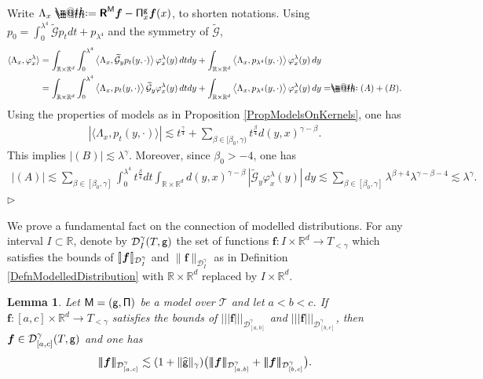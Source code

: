 \documentclass[10pt, reqno]{amsart}
\makeatletter
\numberwithin{subsection}{section}
\numberwithin{subsubsection}{subsection}
\numberwithin{equation}{section} %
\newenvironment{Dem}[1][\unskip]{%
    \begin{list}{\hspace{1.15cm}{\sf \textbf{{\small Proof #1 --}}}}{%
        \setlength{\topsep}{0pt}%
        \setlength{\leftmargin}{0pt}%
        \setlength{\rightmargin}{0pt}%
        \setlength{\listparindent}{0pt}%
        \setlength{\itemindent}{0pt}%
        \setlength{\parsep}{0pt}%
        \addtolength{\leftmargin}{0pt}%
        \addtolength{\rightmargin}{0pt}%
    } \item }{\hfill $\rhd$\end{list}\smallskip}
\theoremstyle{mystyle}
\newtheorem{lem}[thm]{\hspace{-0.14cm}  {Lemma} }%
\theoremstyle{mystyle2}
\theoremstyle{mystyle3}
\newcommand{\trino}[1]{|\!|\!|#1|\!|\!|}
\newcommand{\brarb}[1]{[\hspace{-0.5mm}]#1[\hspace{-0.5mm}]}
\newcommand{\bsf}{\boldsymbol{f}}
\newcommand\bbR{\mathbb{R}}
\newcommand{\mcD}{\mathcal{D}}
\newcommand{\mcG}{\mathcal{G}}
\newcommand*{\defeq}{\mathrel{\rlap{%
                     \raisebox{0.3ex}{$\m@th\cdot$}}%
                     \raisebox{-0.3ex}{$\m@th\cdot$}}%
                     =}
\newcommand*{\eqdef}{=\mathrel{\rlap{%
                     \raisebox{0.3ex}{$\m@th\cdot$}}%
                     \raisebox{-0.3ex}{$\m@th\cdot$}}%
                     }
\makeatother
\begin{document}
\medskip

\begin{Dem}
Write $\Lambda_x \defeq  \textbf{\textsf{R}}^{\sf M}\bsf-{\sf\Pi}_x^{\sf g}\bsf(x)$, to shorten notations. Using $p_0=\int_0^{\lambda^4}\widetilde{\mcG} p_tdt+p_{\lambda^4}$ and the symmetry of $\widetilde{\mcG}$,
\begin{align*}
\langle \Lambda_x,\varphi_x^\lambda \rangle
&= \int_{\bbR\times\bbR^d}\int_0^{\lambda^4}\big\langle \Lambda_x, \widetilde{\mcG}_y 
p_t(y,\cdot)\big\rangle\, \varphi_x^\lambda(y)\,dt dy
+ \int_{\bbR\times\bbR^d} \big\langle \Lambda_x,p_{\lambda^4}(y,\cdot) \big\rangle \,\varphi_x^\lambda(y)\,dy   \\
&= \int_{\bbR\times\bbR^d}\int_0^{\lambda^4}\big\langle \Lambda_x, 
p_t(y,\cdot)\big\rangle\, \widetilde{\mcG}_y \varphi_x^\lambda(y)\,dt dy
+ \int_{\bbR\times\bbR^d} \big\langle \Lambda_x,p_{\lambda^4}(y,\cdot) \big\rangle \,\varphi_x^\lambda(y)\,dy
\eqdef(A)+(B).
\end{align*}
Using the properties of models as in Proposition \ref{PropModelsOnKernels}, one has
\begin{align*}
\left\vert\langle \Lambda_x, p_t(y,\cdot)\rangle\right\vert
\lesssim t^{\frac\gamma4}+\sum_{\beta\in[\beta_0,\gamma)}t^{\frac\beta4}d(y,x)^{\gamma-\beta}.
\end{align*}
This implies $|(B)|\lesssim\lambda^\gamma$. Moreover, since $\beta_0>-4$, one has
\begin{align*}
|(A)|\lesssim
\sum_{\beta\in[\beta_0,\gamma]}\int_0^{\lambda^4}t^{\frac\beta4}dt
\int_{\bbR\times\bbR^d}d(y,x)^{\gamma-\beta}\, |\widetilde{\mcG}_y \varphi_x^\lambda(y)|\,dy
\lesssim
\sum_{\beta\in[\beta_0,\gamma]}\lambda^{\beta+4}\lambda^{\gamma-\beta-4}\lesssim\lambda^\gamma.
\end{align*}
\end{Dem}

\medskip

We prove a fundamental fact on the connection of modelled distributions. For any interval $I\subset\bbR$, denote by $\mcD_I^\gamma(T,{\sf g})$ the set of functions $\bsf:I\times\bbR^d\to T_{<\gamma}$ which satisfies the bounds of $\brarb{\bsf}_{\mcD_I^\gamma}$ and $\|\bsf\|_{\mcD_I^\gamma}$ as in Definition \ref{DefnModelledDistribution} with $\bbR\times\bbR^d$ replaced by $I\times\bbR^d$.

\medskip

\begin{lem}\label{App:lem:connectionMD}
Let $\sf M=(g,\Pi)$ be a model over $\mathscr{T}$ and let $a<b<c$.
If $\bsf:[a,c]\times\bbR^d\to T_{<\gamma}$ satisfies the bounds of $\trino{\bsf}_{\mcD_{[a,b]}^\gamma}$ and $\trino{\bsf}_{\mcD_{[b,c]}^\gamma}$, then $\bsf\in\mcD_{[a,c]}^\gamma(T,{\sf g})$ and one has
$$
\trino{\bsf}_{\mcD_{[a,c]}^\gamma}
\lesssim (1+\|\widehat{\sf g}\|_\gamma)\big(\trino{\bsf}_{\mcD_{[a,b]}^\gamma}+\trino{\bsf}_{\mcD_{[b,c]}^\gamma}\big).
$$
\end{lem}
\end{document}
